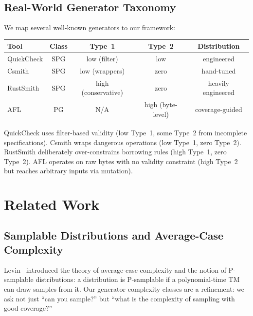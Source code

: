 \documentclass[11pt]{article}
\theoremstyle{remark}
\theoremstyle{definition}
\begin{document}
\subsection{Real-World Generator Taxonomy}\label{sec:real-world-taxonomy}

We map several well-known generators to our framework:

\begin{center}
\begin{tabular}{lcccc}
\hline
\textbf{Tool} & \textbf{Class} & \textbf{Type~1} & \textbf{Type~2} & \textbf{Distribution} \\
\hline
QuickCheck & SPG & low (filter) & low & engineered \\
Csmith     & SPG & low (wrappers) & zero & hand-tuned \\
RustSmith  & SPG & high (conservative) & zero & heavily engineered \\
AFL        & PG  & N/A & high (byte-level) & coverage-guided \\
\hline
\end{tabular}
\end{center}

QuickCheck uses filter-based validity (low Type~1, some Type~2 from incomplete
specifications).  Csmith wraps dangerous operations (low Type~1, zero Type~2).
RustSmith deliberately over-constrains borrowing rules (high Type~1, zero
Type~2).  AFL operates on raw bytes with no validity constraint (high Type~2
but reaches arbitrary inputs via mutation).


\section{Related Work}\label{sec:related-work}

\subsection{Samplable Distributions and Average-Case Complexity}

Levin~\cite{levin1986average} introduced the theory of average-case complexity
and the notion of P-samplable distributions: a distribution is P-samplable if a
polynomial-time TM can draw samples from it.  Our generator complexity classes
are a refinement: we ask not just ``can you sample?'' but ``what is the
complexity of sampling with good coverage?''
\end{document}
